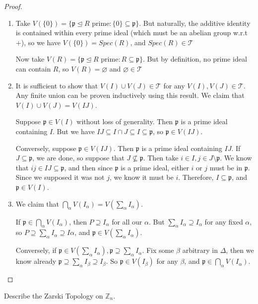 \documentclass{article}
\theoremstyle{plain}%
\newtheorem[L]{thm}{Theorem}[section]
\newtheorem[L]{lem}[thm]{Lemma}
\newtheorem[L]{prop}[thm]{Proposition}
\theoremstyle{definition}
\newtheorem[M]{defn}{Definition}[section]
\newtheorem[M]{exmp}{Example}[section]
\theoremstyle{remark}
\begin{document}
\begin{proof} 
\begin{enumerate}
\item Take $V(\{0\} )=\{\mathfrak{p}\trianglelefteq R \text{ prime}: \{0\} \subseteq \mathfrak{p}\} $. But naturally, the additive identity is contained within every prime ideal (which must be an abelian group w.r.t $+$), so we have  $V(\{0\} )=Spec(R)$, and $Spec(R)\in \mathcal{T}$

Now take $V(R)=\{\mathfrak{p}\trianglelefteq R \text{ prime}: R\subseteq \mathfrak{p}\} $. But by definition, no prime ideal can contain $R$, so $V(R)=\varnothing$ and $\varnothing\in \mathcal{T}$
\item It is sufficient to show that $V(I)\cup V(J)\in \mathcal{T}$ for any $V(I),V(J)\in \mathcal{T}$. Any finite union can be proven inductively using this result. We claim that $V(I)\cup V(J)=V(IJ)$.

    Suppose $\mathfrak{p}\in V(I)$ without loss of generality. Then $\mathfrak{p}$ is a prime ideal containing $I$. But we have $IJ\subseteq I\cap J\subseteq I\subseteq \mathfrak{p}$, so $\mathfrak{p}\in V(IJ)$.

    Conversely, suppose $\mathfrak{p}\in V(IJ)$. Then $\mathfrak{p}$ is a prime ideal containing $IJ$. If $J\subseteq \mathfrak{p}$, we are done, so suppose that $J\not\subseteq \mathfrak{p}$. Then take $i\in I,j\in J\setminus \mathfrak{p}$. We know that $ij\in IJ\subseteq \mathfrak{p}$, and then since $\mathfrak{p}$ is a prime ideal, either $i$ or $j$ must be in $\mathfrak{p}$. Since we supposed it was not $j$, we know it must be $i$. Therefore, $I\subseteq \mathfrak{p}$, and $\mathfrak{p}\in V(I)$.

\item We claim that $\bigcap_{\alpha} V(I_{\alpha})=V\left(\sum_{\alpha}^{} I_\alpha\right)$.

    If $\mathfrak{p}\in \bigcap_{\alpha} V(I_\alpha)$, then $P\supseteq I_\alpha$ for all our $\alpha$. But $\sum_{\alpha}^{} I_\alpha\supseteq I_\alpha$ for any fixed $\alpha$, so $P\supseteq \sum_{\alpha}^{} I_\alpha\supseteq I\alpha$, and $\mathfrak{p}\in V\left( \sum_{\alpha}^{} I_\alpha \right) $.

    Conversely, if $\mathfrak{p}\in V\left( \sum_{\alpha}^{} I_\alpha \right), \mathfrak{p} \supseteq \sum_{\alpha}^{} I_\alpha$. Fix some  $\beta$ arbitrary in $\Delta$, then we know already $\mathfrak{p}\supseteq \sum_{\alpha}^{} I_\beta\supseteq I_\beta $. So $\mathfrak{p}\in V(I_\beta)$ for any $\beta$, and $\mathfrak{p}\in \bigcap_{\alpha}V(I_\alpha) $.

\end{enumerate}
\end{proof}
\begin{exmp}
    Describe the Zarski Topology on $\mathbb{Z}_n$.
\end{exmp}
\end{document}
